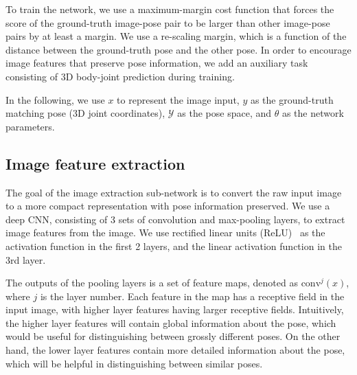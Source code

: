 \documentclass[10pt,twocolumn,letterpaper]{article}
\newcommand{\conv}{\mathrm{conv}}
\begin{document}
%
%
%
%

To train the network, we use a maximum-margin cost function that forces the score
of the ground-truth image-pose pair to be larger than other image-pose pairs by at least a margin.  We use a re-scaling margin, which is a function of the distance between the ground-truth pose and the other pose.
In order to encourage image features that preserve pose information, we add an auxiliary task consisting of 3D body-joint prediction during training.
%
%

In the following, we use $x$ to represent the image input, $y$ as the ground-truth matching pose (3D joint coordinates), $\mathcal{Y}$ as the pose space, and $\theta$ as the network parameters.
%
%

\subsection{Image feature extraction}
%
\vspace{-0.05in}
The goal of the image extraction sub-network is to convert the raw input image to a more compact representation with pose information preserved.
We use a deep CNN, consisting of 3 sets of convolution and max-pooling layers,  to extract image features from the image.
We use rectified linear units (ReLU)~\cite{relu2010} as the activation function in the first 2 layers, and the linear activation function in the 3rd  layer.

The outputs of the pooling layers is a set of feature maps, denoted as $\conv^j(x)$, where $j$ is the layer number. 
Each feature in the map has a receptive field in the input image, with higher layer features having larger receptive fields.
%
%
%
%
Intuitively, the higher layer features will contain global information about the pose, which would be useful for distinguishing between grossly different poses.
%
On the other hand, the lower layer features contain more detailed information about the pose, which will be helpful in distinguishing between similar poses.

%

%
%
%
\end{document}
